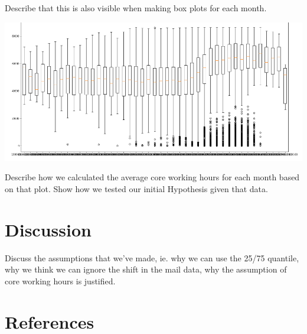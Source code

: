 \documentclass{article}
\begin{document}
Describe that this is also visible when making box plots for each month.
\begin{center}
  \includegraphics[width=0.7\linewidth]{tmp/boxplot_all.png}
\end{center}

Describe how we calculated the average core working hours for each month based
on that plot. Show how we tested our initial Hypothesis given that data.

\section{Discussion}
Discuss the assumptions that we've made, ie. why we can use the 25/75 quantile,
why we think we can ignore the shift in the mail data, why the assumption of
core working hours is justified.

\section{References}


\end{document}
